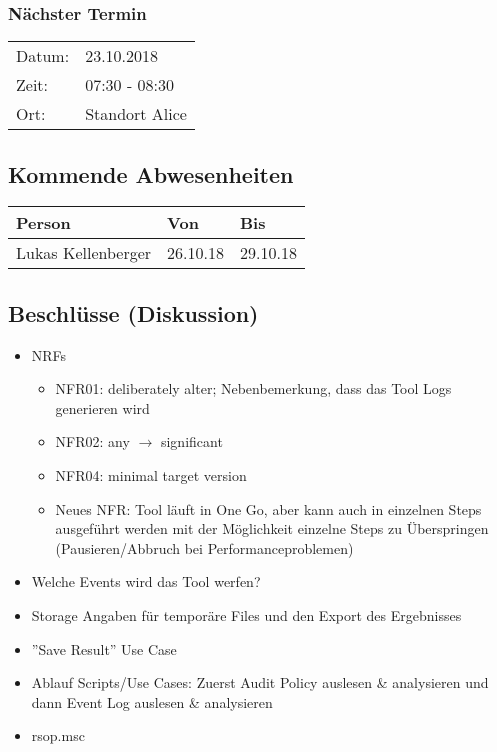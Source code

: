 \subsubsection*{Nächster Termin}

\begin{tabular}{p{4cm} p{12cm}}
    Datum: & 23.10.2018 \\
    Zeit: & 07:30 - 08:30 \\
    Ort: & Standort Alice \\
\end{tabular}

\subsection*{Kommende Abwesenheiten}
\begin{table}[H]
    \centering
    \begin{tabular}{p{6cm} p{5cm} p{5cm}}
        \textbf{Person} & \textbf{Von} & \textbf{Bis} \\ \hline
        Lukas Kellenberger & 26.10.18 & 29.10.18 \\ \hline
    \end{tabular}
\end{table}

\clearpage

\subsection*{Beschlüsse (Diskussion)}
\begin{itemize}
    \item NRFs
    \begin{itemize}
        \item NFR01: deliberately alter; Nebenbemerkung, dass das Tool Logs generieren wird
        \item NFR02: any $\rightarrow$ significant
        \item NFR04: minimal target version
        \item Neues NFR: Tool läuft in One Go, aber kann auch in einzelnen Steps ausgeführt werden mit der Möglichkeit einzelne Steps zu Überspringen (Pausieren/Abbruch bei Performanceproblemen)
    \end{itemize}
    \item Welche Events wird das Tool werfen?
    \item Storage Angaben für temporäre Files und den Export des Ergebnisses
    \item ''Save Result'' Use Case
    \item Ablauf Scripts/Use Cases: Zuerst Audit Policy auslesen \& analysieren und dann Event Log auslesen \& analysieren
    \item rsop.msc
\end{itemize}

